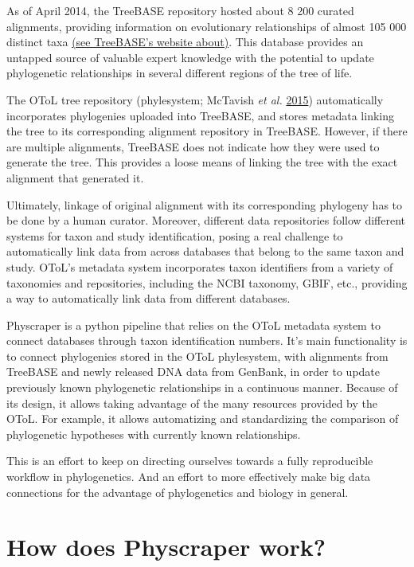 \documentclass[]{article}
\begin{document}
As of April 2014, the TreeBASE repository hosted about 8 200 curated alignments, providing information on evolutionary relationships of almost 105 000 distinct taxa \href{https://www.treebase.org/treebase-web/home.html\#:~:text=TreeBASE\%20is\%20produced\%20and\%20governed,mapped\%20to\%20104\%2C593\%20distinct\%20taxa.}{(see TreeBASE's website about)}.
This database provides an untapped source of valuable expert knowledge with the potential to update phylogenetic relationships in several different regions of the tree of life.

The OToL tree repository (phylesystem; McTavish \emph{et al.} \protect\hyperlink{ref-mctavish2015phylesystem}{2015}) automatically incorporates phylogenies uploaded into TreeBASE, and stores metadata linking the tree to its corresponding alignment repository in TreeBASE. However, if there are multiple alignments, TreeBASE does not indicate how they were used to generate the tree. This provides a loose means of linking the tree with the exact alignment that generated it.

Ultimately, linkage of original alignment with its corresponding phylogeny has to be done by a human curator.
Moreover, different data repositories follow different systems for taxon and study identification, posing a real challenge to automatically link data from across databases that belong to the same taxon and study.
OToL's metadata system incorporates taxon identifiers from a variety of taxonomies and repositories, including the NCBI taxonomy, GBIF, etc., providing a way to automatically link data from different databases.

Physcraper is a python pipeline that relies on the OToL metadata system to connect databases through taxon identification numbers.
It's main functionality is to connect phylogenies stored in the OToL phylesystem, with alignments from TreeBASE and newly released DNA data from GenBank, in order to update previously known phylogenetic relationships in a continuous manner.
Because of its design, it allows taking advantage of the many resources provided by the OToL.
For example, it allows automatizing and standardizing the comparison of phylogenetic hypotheses with currently known relationships.

This is an effort to keep on directing ourselves towards a fully reproducible workflow in phylogenetics.
And an effort to more effectively make big data connections for the advantage of phylogenetics and biology in general.

\hypertarget{how-does-physcraper-work}{%
\section{How does Physcraper work?}\label{how-does-physcraper-work}}
\end{document}
